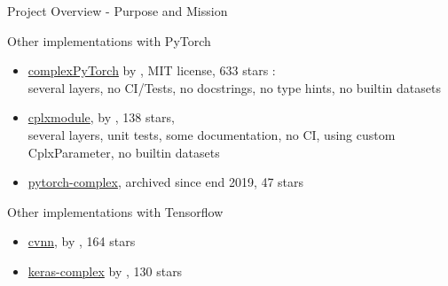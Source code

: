\documentclass[aspectratio=169,10pt]{beamer}
\newcommand{\xmark}{%
\tikz[scale=0.23, color=red] {
    \draw[line width=0.7,line cap=round] (0,0) to [bend left=6] (1,1);
    \draw[line width=0.7,line cap=round] (0.2,0.95) to [bend right=3] (0.8,0.05);
}}
\newcommand{\cmark}{%
\tikz[scale=0.23, color=green] {
    \draw[line width=0.7,line cap=round] (0.25,0) to [bend left=10] (1,1);
    \draw[line width=0.8,line cap=round] (0,0.35) to [bend right=1] (0.23,0);
}}
\newcommand{\greencheck}{}%
\DeclareRobustCommand{\greencheck}{%
  \cmark
}
\newcommand{\redcross}{}%
\DeclareRobustCommand{\redcross}{%
  \xmark
}
\begin{document}
\begin{frame}{Project Overview - Purpose and Mission}




\begin{block}{Other implementations with PyTorch}

\begin{itemize}
\item \href{https://github.com/wavefrontshaping/complexPyTorch}{complexPyTorch} by \cite{Matthes2021}, MIT license, 633 stars : \\
\greencheck several layers,  \redcross no CI/Tests, \redcross no docstrings, \redcross no type hints, \redcross no builtin datasets
\item \href{https://github.com/ivannz/cplxmodule}{cplxmodule}, by \cite{Nazarov2019}, 138 stars,\\
\greencheck several layers, \greencheck unit tests, \greencheck some documentation, \redcross no CI, \redcross using custom CplxParameter, \redcross no builtin datasets %
\item \href{https://github.com/Roger-luo/pytorch-complex}{pytorch-complex}, archived since end 2019, 47 stars
\end{itemize}

\end{block}

\begin{block}{Other implementations with Tensorflow}

\begin{itemize}
\item \href{https://github.com/NEGU93/cvnn}{cvnn}, by \cite{Barrachina2022}, 164 stars
\item \href{https://github.com/JesperDramsch/keras-complex}{keras-complex} by \cite{Matthes2021}, 130 stars
\end{itemize}

\end{block}


\end{frame}
\end{document}
